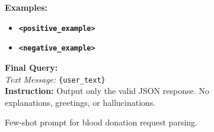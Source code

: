 \documentclass[11pt]{article}
\begin{document}
\begin{figure}[t]
\begin{tcolorbox}[title=\textbf{Few-shot Prompt for Blood Donation Request Parsing}, width=0.95\textwidth, colback=white]
\vspace{0.3em}
\textbf{Examples:}
\begin{itemize}
    \item \textbf{\texttt{<positive\_example>}}
    \item \textbf{\texttt{<negative\_example>}}
\end{itemize}

\vspace{0.3em}
\textbf{Final Query:} \\
\textit{Text Message:} \texttt{\{user\_text\}} \\
\textbf{Instruction:} Output only the valid JSON response. No explanations, greetings, or hallucinations.
\end{tcolorbox}
\caption{Few-shot prompt for blood donation request parsing.}
\label{fig:fewshot-prompt-template}
\end{figure}
\end{document}

